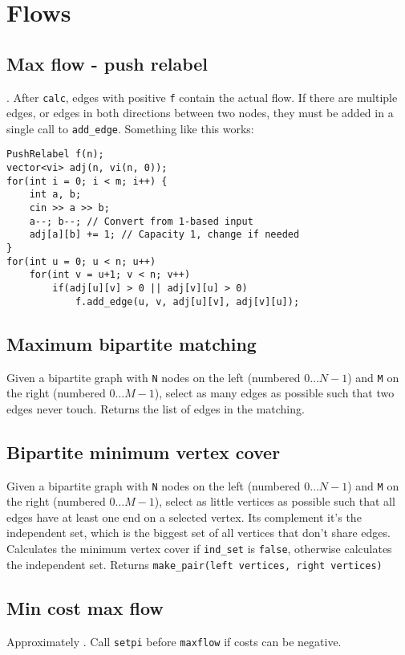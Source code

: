 \section{Flows}

\subsection{Max flow - push relabel}
. After \verb|calc|, edges with positive \verb|f| contain the actual flow.
\warning If there are multiple edges, or edges in both directions between two nodes, they must be added in a single call to \texttt{add\_edge}.
Something like this works:
\begin{lstlisting}
PushRelabel f(n);
vector<vi> adj(n, vi(n, 0));
for(int i = 0; i < m; i++) {
	int a, b;
	cin >> a >> b;
	a--; b--; // Convert from 1-based input
	adj[a][b] += 1; // Capacity 1, change if needed
}
for(int u = 0; u < n; u++)
	for(int v = u+1; v < n; v++)
		if(adj[u][v] > 0 || adj[v][u] > 0)
			f.add_edge(u, v, adj[u][v], adj[v][u]);
\end{lstlisting}

\subsection{Maximum bipartite matching}
Given a bipartite graph with \verb|N| nodes on the left (numbered $0 \ldots N-1$) and \verb|M| on the right (numbered $0 \ldots M-1$), select as many edges as possible such that two edges never touch. Returns the list of edges in the matching.

\subsection{Bipartite minimum vertex cover}
Given a bipartite graph with \verb|N| nodes on the left (numbered $0 \ldots N-1$) and \verb|M| on the right (numbered $0 \ldots M-1$), 
select as little vertices as possible such that all edges have at least one end on a selected vertex.
Its complement it's the independent set, which is the biggest set of all vertices that don't share edges.
Calculates the minimum vertex cover if \verb|ind_set| is \verb|false|, otherwise calculates the independent set.
Returns \verb|make_pair(left vertices, right vertices)|

\subsection{Min cost max flow}
Approximately . Call \texttt{setpi} before \texttt{maxflow} if costs can be negative.
